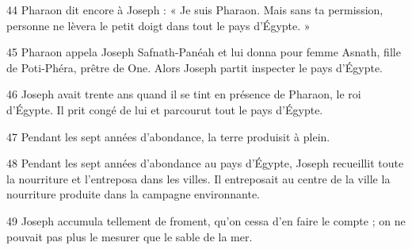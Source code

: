 44 Pharaon dit encore à Joseph : « Je suis Pharaon. Mais sans ta permission, personne ne lèvera le petit doigt dans tout le pays d’Égypte. »

45 Pharaon appela Joseph Safnath-Panéah et lui donna pour femme Asnath, fille de Poti-Phéra, prêtre de One. Alors Joseph partit inspecter le pays d’Égypte.

46 Joseph avait trente ans quand il se tint en présence de Pharaon, le roi d’Égypte. Il prit congé de lui et parcourut tout le pays d’Égypte.

47 Pendant les sept années d’abondance, la terre produisit à plein.

48 Pendant les sept années d’abondance au pays d’Égypte, Joseph recueillit toute la nourriture et l’entreposa dans les villes. Il entreposait au centre de la ville la nourriture produite dans la campagne environnante.

49 Joseph accumula tellement de froment, qu’on cessa d’en faire le compte ; on ne pouvait pas plus le mesurer que le sable de la mer.